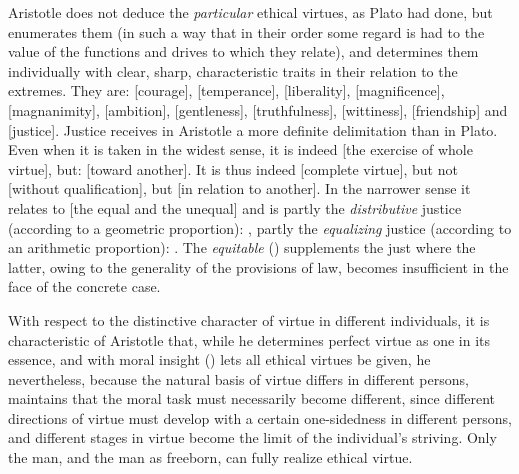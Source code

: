 Aristotle does not deduce the \emph{particular} ethical virtues,
as Plato had done, but enumerates them (in such a way that in
their order some regard is had to the value of the functions and drives
to which they relate), and determines them individually with clear, sharp, characteristic traits in their relation
to the extremes. They are:  [courage],  [temperance],  [liberality],
 [magnificence],  [magnanimity],  [ambition],  [gentleness],  [truthfulness],
 [wittiness],  [friendship] and  [justice]. Justice receives in
Aristotle a more definite delimitation than in Plato. Even when it is taken in the widest sense, it is indeed  \emph{}
 [the exercise of whole virtue], but: \emph{} [toward another]. It is thus indeed 
 [complete virtue], but not  [without qualification], but  [in relation to another]. In the narrower sense it relates to  [the equal and the unequal] and is partly
the \emph{distributive} justice (according to a geometric proportion):
, partly the \emph{equalizing} justice (according to an arithmetic
proportion): . The \emph{equitable} () supplements the just where the latter, owing to the generality of the provisions of law, becomes insufficient in the face of the concrete case.

With respect to the distinctive character of virtue in different
individuals, it is characteristic of Aristotle that, while
he determines perfect virtue as one in its essence,
and with moral insight () lets all ethical
virtues be given, he nevertheless, because the natural
basis of virtue differs in different persons, maintains that the moral task must necessarily become different, since different
directions of virtue must develop with a certain one-sidedness in
different persons, and different stages in virtue become the limit of
the individual's striving. Only the man, and the man as freeborn, can fully realize ethical virtue.

